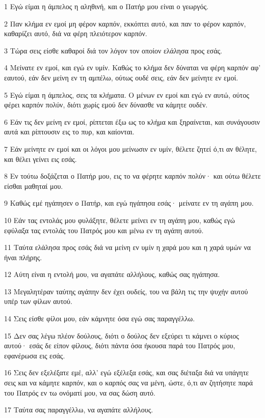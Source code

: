 \par 1 Εγώ είμαι η άμπελος η αληθινή, και ο Πατήρ μου είναι ο γεωργός.
\par 2 Παν κλήμα εν εμοί μη φέρον καρπόν, εκκόπτει αυτό, και παν το φέρον καρπόν, καθαρίζει αυτό, διά να φέρη πλειότερον καρπόν.
\par 3 Τώρα σεις είσθε καθαροί διά τον λόγον τον οποίον ελάλησα προς εσάς.
\par 4 Μείνατε εν εμοί, και εγώ εν υμίν. Καθώς το κλήμα δεν δύναται να φέρη καρπόν αφ' εαυτού, εάν δεν μείνη εν τη αμπέλω, ούτως ουδέ σεις, εάν δεν μείνητε εν εμοί.
\par 5 Εγώ είμαι η άμπελος, σεις τα κλήματα. Ο μένων εν εμοί και εγώ εν αυτώ, ούτος φέρει καρπόν πολύν, διότι χωρίς εμού δεν δύνασθε να κάμητε ουδέν.
\par 6 Εάν τις δεν μείνη εν εμοί, ρίπτεται έξω ως το κλήμα και ξηραίνεται, και συνάγουσιν αυτά και ρίπτουσιν εις το πυρ, και καίονται.
\par 7 Εάν μείνητε εν εμοί και οι λόγοι μου μείνωσιν εν υμίν, θέλετε ζητεί ό,τι αν θέλητε, και θέλει γείνει εις εσάς.
\par 8 Εν τούτω δοξάζεται ο Πατήρ μου, εις το να φέρητε καρπόν πολύν· και ούτω θέλετε είσθαι μαθηταί μου.
\par 9 Καθώς εμέ ηγάπησεν ο Πατήρ, και εγώ ηγάπησα εσάς· μείνατε εν τη αγάπη μου.
\par 10 Εάν τας εντολάς μου φυλάξητε, θέλετε μείνει εν τη αγάπη μου, καθώς εγώ εφύλαξα τας εντολάς του Πατρός μου και μένω εν τη αγάπη αυτού.
\par 11 Ταύτα ελάλησα προς εσάς διά να μείνη εν υμίν η χαρά μου και η χαρά υμών να ήναι πλήρης.
\par 12 Αύτη είναι η εντολή μου, να αγαπάτε αλλήλους, καθώς σας ηγάπησα.
\par 13 Μεγαλητέραν ταύτης αγάπην δεν έχει ουδείς, του να βάλη τις την ψυχήν αυτού υπέρ των φίλων αυτού.
\par 14 Σεις είσθε φίλοι μου, εάν κάμνητε όσα εγώ σας παραγγέλλω.
\par 15 Δεν σας λέγω πλέον δούλους, διότι ο δούλος δεν εξεύρει τι κάμνει ο κύριος αυτού· εσάς δε είπον φίλους, διότι πάντα όσα ήκουσα παρά του Πατρός μου, εφανέρωσα εις εσάς.
\par 16 Σεις δεν εξελέξατε εμέ, αλλ' εγώ εξέλεξα εσάς, και σας διέταξα διά να υπάγητε σεις και να κάμητε καρπόν, και ο καρπός σας να μένη, ώστε, ό,τι αν ζητήσητε παρά του Πατρός εν τω ονόματί μου, να σας δώση αυτό.
\par 17 Ταύτα σας παραγγέλλω, να αγαπάτε αλλήλους.
